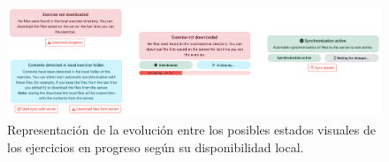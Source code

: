 \begin{figure}[ht]
    \centering
    \includegraphics[width=\textwidth]{imagenes/utilizadas/4-3-implementacion/rf10-1.png}
    \caption{Representación de la evolución entre los posibles estados visuales de los ejercicios en progreso según su disponibilidad local.}
    \label{fig:reqf10-1}
\end{figure}
